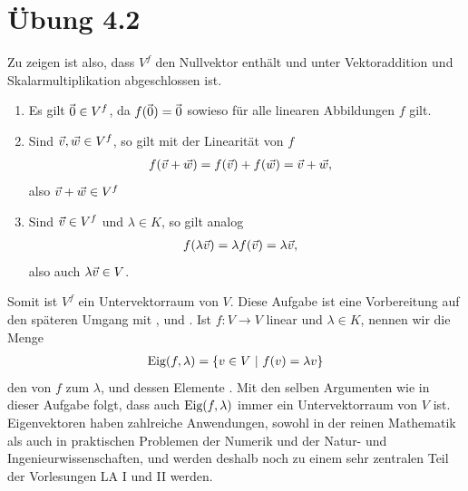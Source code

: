 \documentclass{article}
\begin{document}
\section*{Übung 4.2}
\separator


Zu zeigen ist also, dass $V^f$ den Nullvektor enthält und unter Vektoraddition und Skalarmultiplikation abgeschlossen ist.
\begin{enumerate}
	\item Es gilt $\kern-1.2pt\vec{\kern1.2pt 0} \in V^f$, da $f(\kern-1.2pt\vec{\kern1.2pt 0}) = \kern-1.2pt\vec{\kern1.2pt 0}$ sowieso für alle linearen Abbildungen $f$ gilt.
	\item Sind $\vec{v}, \vec{w} \in V^f$, so gilt mit der Linearität von $f$
	\begin{align*}
		f(\vec{v} + \vec{w}) 
		&=
		f(\vec{v}) + f(\vec{w})
		=
		\vec{v} + \vec{w},
	\end{align*}
	also $\vec{v} + \vec{w} \in V^f$
	\item Sind $\vec{v} \in V^f$ und $\lambda \in K$, so gilt analog
	\begin{align*}
		f(\lambda \vec{v})
		&=
		\lambda f(\vec{v})
		= 
		\lambda \vec{v},
	\end{align*}
	also auch $\lambda \vec{v} \in V$.
\end{enumerate}
Somit ist $V^f$ ein Untervektorraum von $V$.
\newpar
Diese Aufgabe ist eine Vorbereitung auf den späteren Umgang mit ,  und . Ist $f : V \to V$ linear und $\lambda \in K$, nennen wir die Menge
\begin{align*}
	\textnormal{Eig}(f, \lambda) = \qty{v \in V ~\middle|~f(v) = \lambda v}
\end{align*}
den  von $f$ zum  $\lambda$, und dessen Elemente . Mit den selben Argumenten wie in dieser Aufgabe folgt, dass auch $\textnormal{Eig}(f, \lambda)$ immer ein Untervektorraum von $V$ ist. 
\newpar
Eigenvektoren haben zahlreiche Anwendungen, sowohl in der reinen Mathematik als auch in praktischen Problemen der Numerik und der Natur- und Ingenieurwissenschaften, und werden deshalb noch zu einem sehr zentralen Teil der Vorlesungen LA I und II werden.

\clearpage
\end{document}
